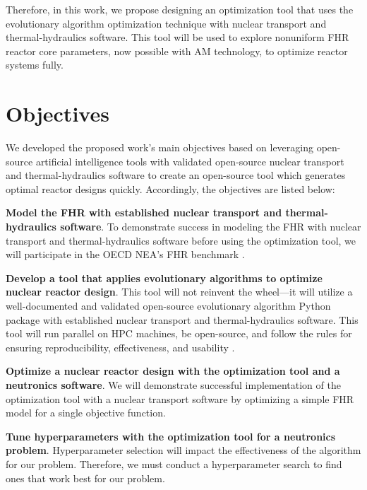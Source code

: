 Therefore, in this work, we propose designing an optimization tool that uses 
the evolutionary algorithm optimization technique with nuclear transport and 
thermal-hydraulics software. 
This tool will be used to explore nonuniform FHR reactor core parameters, now 
possible with \gls{AM} technology, to optimize reactor systems 
fully. 

\section{Objectives}
We developed the proposed work's main objectives based on leveraging 
open-source artificial intelligence tools with validated open-source nuclear 
transport and thermal-hydraulics software to create an open-source tool which 
generates optimal reactor designs quickly. 
Accordingly, the objectives are listed below:

\vspace{0.2cm} 
\noindent
\textbf{Model the \gls{FHR} with established 
nuclear transport and thermal-hydraulics software}.
To demonstrate success in modeling the \gls{FHR} with nuclear transport and 
thermal-hydraulics software before using the optimization tool, we will 
participate in the \gls{OECD} \gls{NEA}'s \gls{FHR} benchmark 
\cite{noauthor_fluoride_nodate}. 

\vspace{0.2cm} 
\noindent
\textbf{Develop a tool that applies evolutionary algorithms to optimize nuclear 
reactor design}. 
This tool will not reinvent the wheel---it will utilize a well-documented 
and validated open-source evolutionary algorithm Python package with established 
nuclear transport and thermal-hydraulics software. This tool will run parallel on 
\gls{HPC} machines, be open-source, and follow the rules for ensuring 
reproducibility, effectiveness, and usability 
\cite{list_ten_2017,osborne_ten_2014,sandve_ten_2013}. 

\vspace{0.2cm} 
\noindent
\textbf{Optimize a nuclear reactor design with the optimization tool and a 
neutronics software}. 
We will demonstrate successful implementation of the optimization tool with a
nuclear transport software by optimizing a simple \gls{FHR} model for a single 
objective function. 

\vspace{0.2cm} 
\noindent
\textbf{Tune hyperparameters with the optimization tool for a neutronics problem}.
Hyperparameter selection will impact the effectiveness of the algorithm 
for our problem. 
Therefore, we must conduct a hyperparameter search to find ones that work best 
for our problem. 

